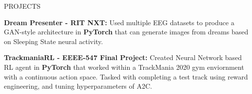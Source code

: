 \documentclass{resume} %
\begin{document}

\begin{rSection}{PROJECTS}
\vspace{-0.75em}
\item \textbf{Dream Presenter - RIT NXT:} {Used multiple EEG datasets to produce a GAN-style architecture in \textbf{PyTorch} that can generate images from dreams based on Sleeping State neural activity.}
\item \textbf{TrackmaniaRL - EEEE-547 Final Project:} {Created Neural Network based RL agent in \textbf{PyTorch} that worked within a TrackMania 2020 gym enviornment with a continuous action space.
Tasked with completing a test track using reward engineering, and tuning hyperparameters of A2C.}
\end{rSection} 
\end{document}

